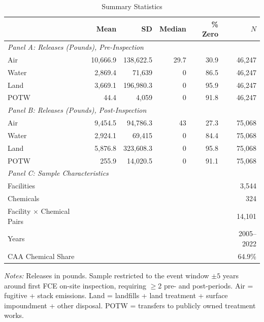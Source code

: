 \begin{table}[t]
\centering
\caption{Summary Statistics}
\label{tab:summary}
\small
\begin{tabular}{lrrrrr}
\hline\hline
& Mean & SD & Median & \% Zero & $N$ \\
\hline
\multicolumn{6}{l}{\textit{Panel A: Releases (Pounds), Pre-Inspection}} \\[2pt]
\quad Air & 10,666.9 & 138,622.5 & 29.7 & 30.9 & 46,247 \\
\quad Water & 2,869.4 & 71,639 & 0 & 86.5 & 46,247 \\
\quad Land & 3,669.1 & 196,980.3 & 0 & 95.9 & 46,247 \\
\quad POTW & 44.4 & 4,059 & 0 & 91.8 & 46,247 \\
[4pt]
\multicolumn{6}{l}{\textit{Panel B: Releases (Pounds), Post-Inspection}} \\[2pt]
\quad Air & 9,454.5 & 94,786.3 & 43 & 27.3 & 75,068 \\
\quad Water & 2,924.1 & 69,415 & 0 & 84.4 & 75,068 \\
\quad Land & 5,876.8 & 323,608.3 & 0 & 95.8 & 75,068 \\
\quad POTW & 255.9 & 14,020.5 & 0 & 91.1 & 75,068 \\
[4pt]
\hline
\multicolumn{6}{l}{\textit{Panel C: Sample Characteristics}} \\[2pt]
Facilities & \multicolumn{4}{r}{} & 3,544 \\
Chemicals & \multicolumn{4}{r}{} & 324 \\
Facility $\times$ Chemical Pairs & \multicolumn{4}{r}{} & 14,101 \\
Years & \multicolumn{4}{r}{} & 2005--2022 \\
CAA Chemical Share & \multicolumn{4}{r}{} & 64.9\% \\
\hline\hline
\end{tabular}
\vspace{0.3em}
\begin{minipage}{\textwidth}
\footnotesize
\textit{Notes:} Releases in pounds. Sample restricted to the event window $\pm 5$ years around first FCE on-site inspection, requiring $\geq$2 pre- and post-periods. Air = fugitive + stack emissions. Land = landfills + land treatment + surface impoundment + other disposal. POTW = transfers to publicly owned treatment works.
\end{minipage}
\end{table}

